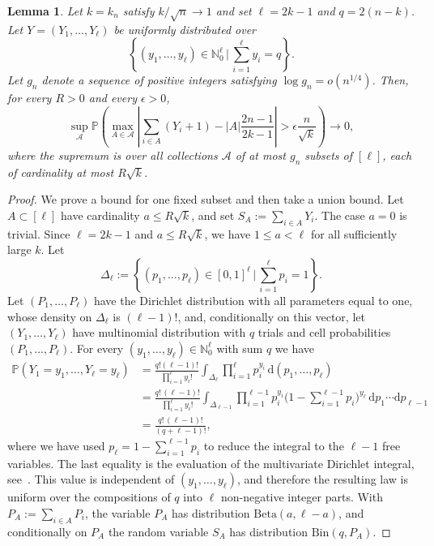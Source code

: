 \documentclass[english,11pt]{smfart}
\newcommand{\ndN}{\mathbb{N}}
\newcommand{\Prb}[1]{\mathbb{P}\left(#1\right)}
\newtheorem{lemma}[theorem]{Lemma}
\numberwithin{equation}{section}
\begin{document}
\begin{lemma}
	\label{le:blowup}
	Let $k = k_n$ satisfy $k / \sqrt n \to 1$ and set $\ell = 2k-1$ and $q=2(n-k)$. Let $Y = (Y_1,\ldots,Y_\ell)$ be uniformly distributed over
	\[
		\left\{(y_1,\ldots,y_\ell) \in \ndN_0^\ell \,\Bigg|\, \sum_{i=1}^\ell y_i=q\right\}.
	\]
	Let $g_n$ denote a sequence of positive integers satisfying $\log g_n = o(n^{1/4})$. Then, for every $R>0$ and every $\epsilon>0$,
	\[
		\sup_{\mathcal A} \Prb{\max_{A \in \mathcal A} \left|\sum_{i\in A}(Y_i+1) - |A| \frac{2n-1}{2k-1}\right| > \epsilon \frac{n}{\sqrt{k}}} \to 0,
	\]
	where the supremum is over all collections $\mathcal A$ of at most $g_n$ subsets of
	$[\ell]$, each of cardinality at most $R \sqrt{k}$.
\end{lemma}
\begin{proof}
	We prove a bound for one fixed subset and then take a union bound. Let $A \subset [\ell]$ have cardinality $a \le R \sqrt{k}$, and set $S_A := \sum_{i\in A} Y_i$. The case $a=0$ is trivial. Since $\ell = 2k - 1$ and $a \le R \sqrt{k}$, we have $1 \le a < \ell$ for all sufficiently large $k$. Let
	\[
		\Delta_\ell := \left\{(p_1,\ldots,p_\ell) \in [0,1]^\ell \,\Bigg|\, \sum_{i=1}^\ell p_i = 1 \right\}.
	\]
	Let $(P_1, \ldots, P_\ell)$ have the Dirichlet distribution with all parameters equal to one, whose density on $\Delta_\ell$ is $(\ell-1)!$, and, conditionally on this vector, let $(Y_1, \ldots, Y_\ell)$ have multinomial distribution with $q$ trials and cell probabilities $(P_1, \ldots, P_\ell)$. For every $(y_1, \ldots, y_\ell)\in\ndN_0^\ell$ with sum $q$ we  have
	\begin{align*}
		\Prb{Y_1 = y_1, \ldots, Y_\ell = y_\ell} 
		&= \frac{q!(\ell-1)!}{\prod_{i=1}^\ell y_i!} \int_{\Delta_\ell}\prod_{i=1}^\ell p_i^{y_i}\,\mathrm{d}(p_1, \ldots, p_\ell) \\ 
		&= \frac{q!\,(\ell-1)!}{\prod_{i=1}^\ell y_i!} \int_{\Delta_{\ell-1}} \prod_{i=1}^{\ell-1} p_i^{y_i} \Big(1 - \sum_{i=1}^{\ell-1} p_i\Big)^{y_\ell}
		\,\mathrm{d}p_1\cdots\mathrm{d}p_{\ell-1} \\
		&=  \frac{q!\,(\ell-1)!}{(q+\ell-1)!},
\end{align*}
where we have used $p_\ell = 1 - \sum_{i=1}^{\ell-1} p_i$ to reduce the integral to
the $\ell-1$ free variables. The last equality is the evaluation of the multivariate Dirichlet integral, see~\cite{zbMATH01574099}. This value is independent of $(y_1, \ldots, y_\ell)$, and therefore the resulting law is uniform over the compositions of $q$ into $\ell$ non-negative integer parts. With $P_A := \sum_{i \in A} P_i$, the variable $P_A$ has distribution $\mathrm{Beta}(a, \ell - a)$, and conditionally on $P_A$ the random variable $S_A$ has distribution $\mathrm{Bin}(q, P_A)$.
	

\end{proof}
\end{document}
